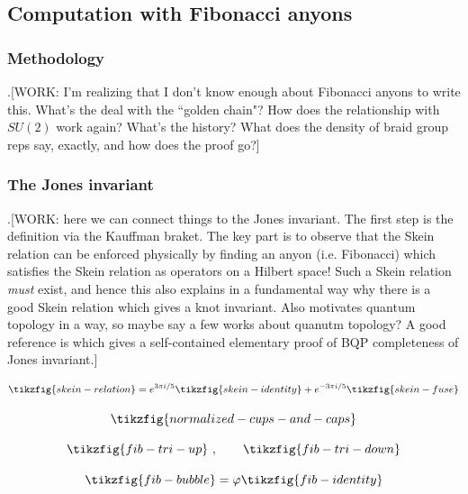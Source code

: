 \subsection{Computation with Fibonacci anyons}

\subsubsection{Methodology}

.[WORK: I'm realizing that I don't know enough about Fibonacci anyons to write this. What's the deal with the ``golden chain"? How does the relationship with $SU(2)$ work again? What's the history? What does the density of braid group reps say, exactly, and how does the proof go?]

\subsubsection{The Jones invariant}

.[WORK: here we can connect things to the Jones invariant. The first step is the definition via the Kauffman braket. The key part is to observe that the Skein relation can be enforced physically by finding an anyon (i.e. Fibonacci) which satisfies the Skein relation as operators on a Hilbert space! Such a Skein relation \textit{must} exist, and hence this also explains in a fundamental way why there is a good Skein relation which gives a knot invariant. Also motivates quantum topology in a way, so maybe say a few works about quanutm topology? A good reference is \cite{aharonov2011bqp} which gives a self-contained elementary proof of BQP completeness of Jones invariant.]

\begin{equation*}
\tikzfig{skein-relation} =  e^{3\pi i /5}\tikzfig{skein-identity} + e^{-3\pi i /5}\tikzfig{skein-fuse}
\end{equation*}

\begin{equation*}
\tikzfig{normalized-cups-and-caps}
\end{equation*}

\begin{equation*}
\tikzfig{fib-tri-up}\,\, ,\qquad \tikzfig{fib-tri-down}
\end{equation*}

\begin{equation*}
\tikzfig{fib-bubble} = \varphi \tikzfig{fib-identity}
\end{equation*}

